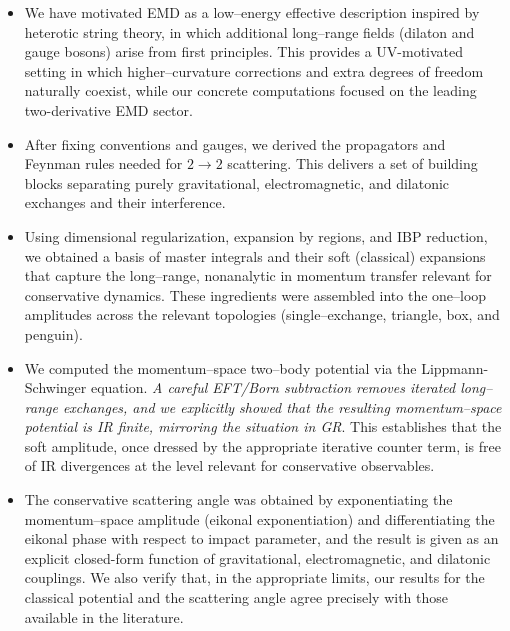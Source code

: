 \begin{itemize}
  \item  We have motivated EMD as a low–energy effective description inspired by heterotic string theory, in which additional long–range fields (dilaton and gauge bosons) arise from first principles. This provides a UV-motivated setting in which higher–curvature corrections and extra degrees of freedom naturally coexist, while our concrete computations focused on the leading two-derivative EMD sector.
  \item After fixing conventions and gauges, we derived the propagators and Feynman rules needed for $2\!\to\!2$ scattering. This delivers a set of building blocks separating purely gravitational, electromagnetic, and dilatonic exchanges and their interference.
  \item  Using dimensional regularization, expansion by regions, and IBP reduction, we obtained a basis of master integrals and their soft (classical) expansions that capture the long–range, nonanalytic in momentum transfer relevant for conservative dynamics. These ingredients were assembled into the one–loop amplitudes across the relevant topologies (single–exchange, triangle, box, and penguin).
  \item We computed the momentum–space two–body potential via the Lippmann-Schwinger equation. \textit{A careful EFT/Born subtraction removes iterated long–range exchanges, and we explicitly showed that the resulting momentum–space potential is IR finite, mirroring the situation in GR}. This establishes that the soft amplitude, once dressed by the appropriate iterative counter term, is free of IR divergences at the level relevant for conservative observables.
  \item  The conservative scattering angle was obtained by exponentiating the momentum–space amplitude (eikonal exponentiation) and differentiating the eikonal phase with respect to impact parameter, and the result is given as an explicit closed-form function of gravitational, electromagnetic, and dilatonic couplings. We also verify that, in the appropriate limits, our results for the classical potential and the scattering angle agree precisely with those available in the literature.

\end{itemize}
